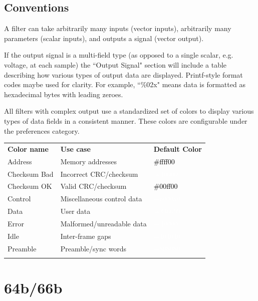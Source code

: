 \subsection{Conventions}

A filter can take arbitrarily many inputs (vector inputs), arbitrarily many parameters (scalar inputs), and outputs a
signal (vector output).

If the output signal is a multi-field type (as opposed to a single scalar, e.g. voltage, at each sample) the
``Output Signal" section will include a table describing how various types of output data are displayed. Printf-style
format codes maybe used for clarity. For example, ``\%02x" means data is formatted as hexadecimal bytes with leading
zeroes.

All filters with complex output use a standardized set of colors to display various types of data fields in a
consistent manner. These colors are configurable under the  preferences category.

\begin{tabularx}{16cm}{llX}
\thickhline
\textbf{Color name} & \textbf{Use case} & \textbf{Default Color} \\
\thickhline
Address & Memory addresses & \cellcolor{address}\textcolor{black}{\#ffff00} \\
\thickhline
Checksum Bad & Incorrect CRC/checksum & \cellcolor{checksumbad}\textcolor{white}{\#ff0000} \\
\thickhline
Checksum OK & Valid CRC/checksum & \cellcolor{checksumok}\textcolor{black}{\#00ff00} \\
\thickhline
Control & Miscellaneous control data & \cellcolor{control}\textcolor{white}{\#c000a0} \\
\thickhline
Data & User data & \cellcolor{data}\textcolor{white}{\#336699} \\
\thickhline
Error & Malformed/unreadable data & \cellcolor{error}\textcolor{white}{\#ff0000} \\
\thickhline
Idle & Inter-frame gaps & \cellcolor{idle}\textcolor{white}{\#404040} \\
\thickhline
Preamble & Preamble/sync words & \cellcolor{preamble}\textcolor{white}{\#808080} \\
\thickhline
\end{tabularx}

\pagebreak
\section{64b/66b}
\label{filter:64b66b}

